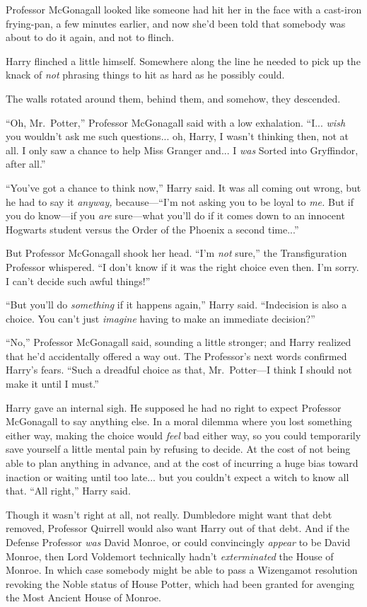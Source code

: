Professor McGonagall looked like someone had hit her in the face with a cast-iron frying-pan, a few minutes earlier, and now she’d been told that somebody was about to do it again, and not to flinch.

Harry flinched a little himself. Somewhere along the line he needed to pick up the knack of \emph{not} phrasing things to hit as hard as he possibly could.

The walls rotated around them, behind them, and somehow, they descended.

“Oh, Mr.~Potter,” Professor McGonagall said with a low exhalation. “I... \emph{wish} you wouldn’t ask me such questions... oh, Harry, I wasn’t thinking then, not at all. I only saw a chance to help Miss Granger and... I \emph{was} Sorted into Gryffindor, after all.”

“You’ve got a chance to think now,” Harry said. It was all coming out wrong, but he had to say it \emph{anyway,} because—“I’m not asking you to be loyal to \emph{me.} But if you do know—if you \emph{are} sure—what you’ll do if it comes down to an innocent Hogwarts student versus the Order of the Phoenix a second time...”

But Professor McGonagall shook her head. “I’m \emph{not} sure,” the Transfiguration Professor whispered. “I don’t know if it was the right choice even then. I’m sorry. I can’t decide such awful things!”

“But you’ll do \emph{something} if it happens again,” Harry said. “Indecision is also a choice. You can’t just \emph{imagine} having to make an immediate decision?”

“No,” Professor McGonagall said, sounding a little stronger; and Harry realized that he’d accidentally offered a way out. The Professor’s next words confirmed Harry’s fears. “Such a dreadful choice as that, Mr.~Potter—I think I should not make it until I must.”

Harry gave an internal sigh. He supposed he had no right to expect Professor McGonagall to say anything else. In a moral dilemma where you lost something either way, making the choice would \emph{feel} bad either way, so you could temporarily save yourself a little mental pain by refusing to decide. At the cost of not being able to plan anything in advance, and at the cost of incurring a huge bias toward inaction or waiting until too late... but you couldn’t expect a witch to know all that. “All right,” Harry said.

Though it wasn’t right at all, not really. Dumbledore might want that debt removed, Professor Quirrell would also want Harry out of that debt. And if the Defense Professor \emph{was} David Monroe, or could convincingly \emph{appear} to be David Monroe, then Lord Voldemort technically hadn’t \emph{exterminated} the House of Monroe. In which case somebody might be able to pass a Wizengamot resolution revoking the Noble status of House Potter, which had been granted for avenging the Most Ancient House of Monroe.

